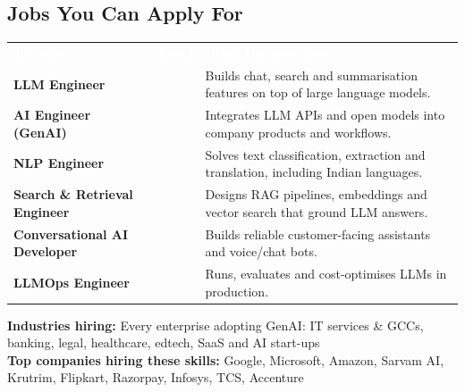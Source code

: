\documentclass[10pt,a4paper]{article}
\newcommand{\hdr}{\rowcolor{navy}}
\newcommand{\hw}[1]{\textcolor{white}{\bfseries #1}}
\begin{document}
\subsection*{Jobs You Can Apply For}
\par{\small\begin{tabularx}{\linewidth}{@{}>{\raggedright\arraybackslash}p{4.6cm}>{\raggedright\arraybackslash}p{2.5cm}Y@{}}\hdr\hw{Job role}&\hw{Level}&\hw{What the role does}\\
\textbf{LLM Engineer} &  & Builds chat, search and summarisation features on top of large language models.\\
\textbf{AI Engineer (GenAI)} &  & Integrates LLM APIs and open models into company products and workflows.\\
\textbf{NLP Engineer} &  & Solves text classification, extraction and translation, including Indian languages.\\
\textbf{Search \& Retrieval Engineer} &  & Designs RAG pipelines, embeddings and vector search that ground LLM answers.\\
\textbf{Conversational AI Developer} &  & Builds reliable customer-facing assistants and voice/chat bots.\\
\textbf{LLMOps Engineer} &  & Runs, evaluates and cost-optimises LLMs in production.\\
\end{tabularx}}
{\small\textbf{Industries hiring:} Every enterprise adopting GenAI: IT services \& GCCs, banking, legal, healthcare, edtech, SaaS and AI start-ups\\[2pt]\textbf{Top companies hiring these skills:} Google, Microsoft, Amazon, Sarvam AI, Krutrim, Flipkart, Razorpay, Infosys, TCS, Accenture}
\end{document}
